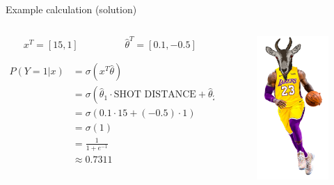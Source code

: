 \documentclass[aspectratio=169]{../latex_main/tntbeamer}  %
\begin{document}
	
	\begin{frame}{Example calculation (solution)}
	   
	   \begin{columns}
	    
	   \begin{column}{.5\textwidth}
	   \begin{equation*}
	       x^T = [15, 1]\hspace{2cm} \hat{\theta}^T = [0.1, -0.5]
	   \end{equation*}
	   
	   \begin{align*}
	       P(Y=1|x) &= \sigma (x^T\hat{\theta})\\
	       &= \sigma (\hat{\theta}_1 \cdot \text{SHOT DISTANCE} + \hat{\theta}_2 \cdot \text{SECONDS LEFT} )\\
	       &=  \sigma (0.1 \cdot 15 + (-0.5) \cdot 1 )\\
	       &= \sigma (1)\\
	       &= \frac{1}{1 + e^{-1}}\\
	       &\approx 0.7311
	   \end{align*}
	    \end{column}
	    \begin{column}{.5\textwidth}
	        \begin{figure}
	            \centering
	            \includegraphics[scale=.5]{Bild8}
	        \end{figure}
	    \end{column}
	    
	    \end{columns}
	\end{frame}
	
\end{document}
